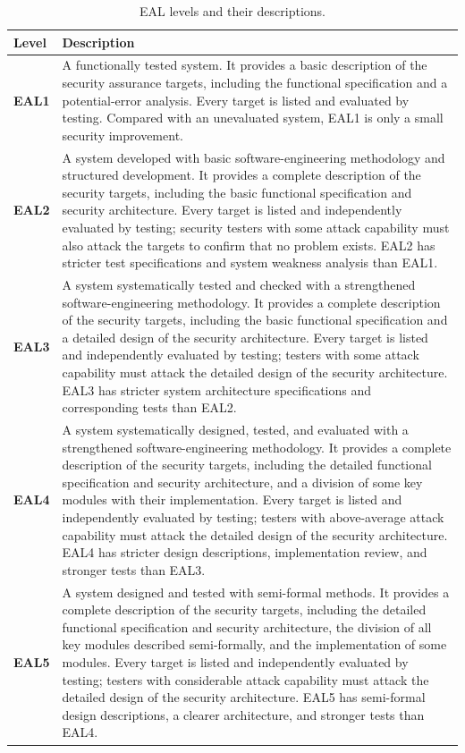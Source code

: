 \begin{table}[htbp]
    \centering
    \caption{EAL levels and their descriptions.}
    \label{tab:eal}
    \small
    \begin{tabularx}{\textwidth}{@{}>{\sffamily\bfseries\color{rmppurple}}p{1.2cm} X@{}}
        \toprule
        Level & Description\\
        \midrule
        EAL1 & A functionally tested system. It provides a basic description of the security assurance targets, including the functional specification and a potential-error analysis. Every target is listed and evaluated by testing. Compared with an unevaluated system, EAL1 is only a small security improvement.\\
        EAL2 & A system developed with basic software-engineering methodology and structured development. It provides a complete description of the security targets, including the basic functional specification and security architecture. Every target is listed and independently evaluated by testing; security testers with some attack capability must also attack the targets to confirm that no problem exists. EAL2 has stricter test specifications and system weakness analysis than EAL1.\\
        EAL3 & A system systematically tested and checked with a strengthened software-engineering methodology. It provides a complete description of the security targets, including the basic functional specification and a detailed design of the security architecture. Every target is listed and independently evaluated by testing; testers with some attack capability must attack the detailed design of the security architecture. EAL3 has stricter system architecture specifications and corresponding tests than EAL2.\\
        EAL4 & A system systematically designed, tested, and evaluated with a strengthened software-engineering methodology. It provides a complete description of the security targets, including the detailed functional specification and security architecture, and a division of some key modules with their implementation. Every target is listed and independently evaluated by testing; testers with above-average attack capability must attack the detailed design of the security architecture. EAL4 has stricter design descriptions, implementation review, and stronger tests than EAL3.\\
        EAL5 & A system designed and tested with semi-formal methods. It provides a complete description of the security targets, including the detailed functional specification and security architecture, the division of all key modules described semi-formally, and the implementation of some modules. Every target is listed and independently evaluated by testing; testers with considerable attack capability must attack the detailed design of the security architecture. EAL5 has semi-formal design descriptions, a clearer architecture, and stronger tests than EAL4.\\

\end{tabularx}
\end{table}
